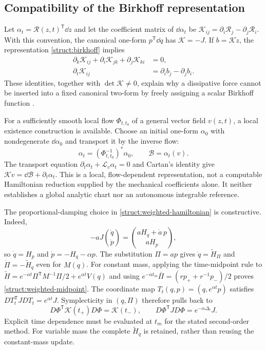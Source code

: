 \subsection{Compatibility of the Birkhoff representation}
\label{ss:birkhoff}

Let $\alpha_t=\mathcal R(z,t)^{\mathsf T}\dd z$ and let the coefficient matrix of $\dd\alpha_t$ be $\mathcal K_{ij}=\partial_i\mathcal R_j-\partial_j\mathcal R_i$. With this convention, the canonical one-form $p^{\mathsf T}\dd q$ has $\mathcal K=-J$. If $b=\mathcal K\dot z$, the representation \eqref{struct:birkhoff} implies
\begin{equation}\label{ss:birkhoff-compatibility}
\begin{aligned}
 \partial_k\mathcal K_{ij}+\partial_i\mathcal K_{jk}
                       +\partial_j\mathcal K_{ki}&=0,\\
 \partial_t\mathcal K_{ij}&=\partial_i b_j-\partial_j b_i.
\end{aligned}
\end{equation}
These identities, together with $\det\mathcal K\ne0$, explain why a dissipative force cannot be inserted into a fixed canonical two-form by freely assigning a scalar Birkhoff function \citep{su2007,fengqin}.

For a sufficiently smooth local flow $\Phi_{t,t_0}$ of a general vector field $v(z,t)$, a local existence construction is available. Choose an initial one-form $\alpha_0$ with nondegenerate $\dd\alpha_0$ and transport it by the inverse flow:
\[
 \alpha_t=(\Phi_{t,t_0}^{-1})^*\alpha_0,
 \qquad\mathcal B=\alpha_t(v).
\]
The transport equation $\partial_t\alpha_t+\mathcal L_v\alpha_t=0$ and Cartan's identity give $\mathcal K v=\dd\mathcal B+\partial_t\alpha_t$. This is a local, flow-dependent representation, not a computable Hamiltonian reduction supplied by the mechanical coefficients alone. It neither establishes a global analytic chart nor an autonomous integrable reference.

The proportional-damping choice in \eqref{struct:weighted-hamiltonian} is constructive. Indeed,
\[
 -aJ\binom{\dot q}{\dot p}
 =\binom{aH_q+\dot a\,p}{aH_p},
\]
so $\dot q=H_p$ and $\dot p=-H_q-\alpha p$. The substitution $\Pi=ap$ gives
$\dot q=\widetilde H_\Pi$ and $\dot\Pi=-\widetilde H_q$ even for $M(q)$. For constant mass, applying the time-midpoint rule to
$\widetilde H=e^{-\alpha t}\Pi^{\mathsf T}M^{-1}\Pi/2+e^{\alpha t}V(q)$
and using $e^{-\alpha t_m}\bar\Pi=(r p_++r^{-1}p_-)/2$ proves \eqref{struct:weighted-midpoint}. The coordinate map $T_t(q,p)=(q,e^{\alpha t}p)$ satisfies $DT_t^{\mathsf T}JDT_t=e^{\alpha t}J$. Symplecticity in $(q,\Pi)$ therefore pulls back to
\[
 D\Phi^{\mathsf T}\mathcal K(t_+)D\Phi=\mathcal K(t_-),
 \qquad D\Phi^{\mathsf T}JD\Phi=e^{-\alpha\Delta_t}J.
\]
Explicit time dependence must be evaluated at $t_m$ for the stated second-order method. For variable mass the complete $\widetilde H_q$ is retained, rather than reusing the constant-mass update.

